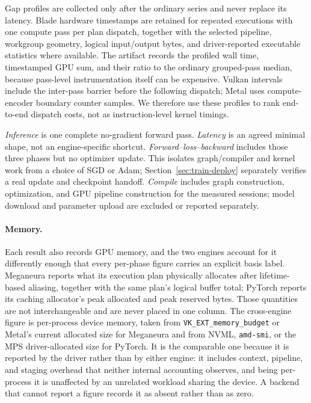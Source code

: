 \documentclass[10pt,twocolumn]{article}
\newcommand{\system}{Meganeura}
\newcommand{\code}[1]{\texttt{#1}}
\begin{document}
Gap profiles are collected only after the ordinary series and never replace
its latency. Blade hardware timestamps are retained for repeated executions
with one compute pass per plan dispatch, together with the selected pipeline,
workgroup geometry, logical input/output bytes, and driver-reported executable
statistics where available. The artifact records the profiled wall time,
timestamped GPU sum, and their ratio to the ordinary grouped-pass median,
because pass-level instrumentation itself can be expensive. Vulkan intervals
include the inter-pass barrier before the following dispatch; Metal uses
compute-encoder boundary counter samples. We therefore use these profiles to
rank end-to-end dispatch costs, not as instruction-level kernel timings.

\textit{Inference} is one complete no-gradient forward pass.
\textit{Latency} is an agreed minimal shape, not an engine-specific shortcut.
\textit{Forward--loss--backward} includes those three phases but no optimizer
update. This isolates graph/compiler and kernel work from a choice of SGD or
Adam; Section~\ref{sec:train-deploy} separately verifies a real update and
checkpoint handoff. \textit{Compile} includes graph construction,
optimization, and GPU pipeline construction for the measured sessions; model
download and parameter upload are excluded or reported separately.

\paragraph{Memory.}
Each result also records GPU memory, and the two engines account for it
differently enough that every per-phase figure carries an explicit basis
label. \system{} reports what its execution plan physically allocates after
lifetime-based aliasing, together with the same plan's logical buffer total;
PyTorch reports its caching allocator's peak allocated and peak reserved
bytes. Those quantities are not interchangeable and are never placed in one
column. The cross-engine figure is per-process device memory, taken from
\code{VK\_EXT\_memory\_budget} or Metal's current allocated size for
\system{} and from NVML, \code{amd-smi}, or the MPS driver-allocated size
for PyTorch. It is the comparable one because it is reported by the driver
rather than by either engine: it includes context, pipeline, and staging
overhead that neither internal accounting observes, and being per-process it
is unaffected by an unrelated workload sharing the device. A backend that
cannot report a figure records it as absent rather than as zero.
\end{document}
